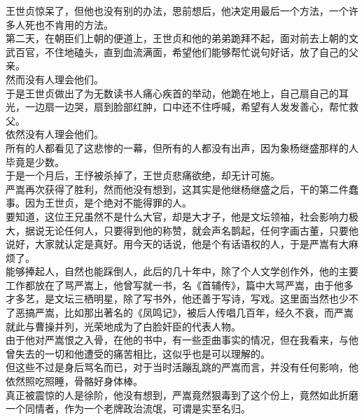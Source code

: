 \begin{multicols}{\theparacolNo}
王世贞惊呆了，但他也没有别的办法，思前想后，他决定用最后一个方法，一个许多人死也不肯用的方法。\\

第二天，在朝臣们上朝的便道上，王世贞和他的弟弟跪拜不起，面对前去上朝的文武百官，不住地磕头，直到血流满面，希望他们能够帮忙说句好话，放了自己的父亲。\\

然而没有人理会他们。\\

于是王世贞做出了为无数读书人痛心疾首的举动，他跪在地上，自己扇自己的耳光，一边扇一边哭，扇到脸部红肿，口中还不住呼喊，希望有人发发善心，帮忙救父。\\

依然没有人理会他们。\\

所有的人都看见了这悲惨的一幕，但所有的人都没有出声，因为象杨继盛那样的人毕竟是少数。\\

于是一个月后，王忬被杀掉了，王世贞悲痛欲绝，却无计可施。\\

严嵩再次获得了胜利，然而他没有想到，这其实是他继杨继盛之后，干的第二件蠢事。因为王世贞，是个绝对不能得罪的人。\\

要知道，这位王兄虽然不是什么大官，却是大才子，他是文坛领袖，社会影响力极大，据说无论任何人，只要得到他的称赞，就会声名鹊起，任何字画古董，只要他说好，大家就认定是真好。用今天的话说，他是个有话语权的人，于是严嵩有大麻烦了。\\

能够捧起人，自然也能踩倒人，此后的几十年中，除了个人文学创作外，他的主要工作都放在了骂严嵩上，他曾写就一书，名《首辅传》，篇中大骂严嵩，由于他多才多艺，是文坛三栖明星，除了写书外，他还善于写诗，写戏。这里面当然也少不了恶搞严嵩，比如那出著名的《凤鸣记》，被后人传唱几百年，经久不衰，而严嵩就此与曹操并列，光荣地成为了白脸奸臣的代表人物。\\

由于他对严嵩恨之入骨，在他的书中，有一些歪曲事实的情况，但在我看来，与他曾失去的一切和他遭受的痛苦相比，这似乎也是可以理解的。\\

但这些不过是身后骂名而已，对于当时活蹦乱跳的严嵩而言，并没有任何影响，他依然照吃照睡，骨骼好身体棒。\\

真正被震惊的人是徐阶，他没有想到，严嵩竟然狠毒到了这个份上，竟然如此折磨一个同情者，作为一个老牌政治流氓，可谓是实至名归。\\


\end{multicols}

